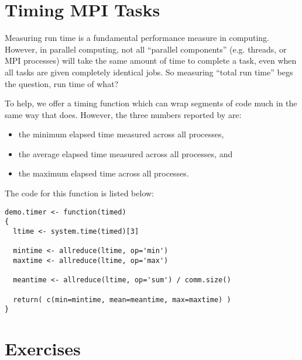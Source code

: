 \section{Timing MPI Tasks}

Measuring run time is a fundamental performance measure in computing.
However, in parallel computing, not all ``parallel components'' (e.g.
threads, or MPI processes) will take the same amount of time to complete
a task, even when all tasks are given completely identical jobs.
So measuring ``total run time'' begs the question, run time of what?

To help, we offer a timing function  which can wrap
segments of code much in the same way that  does.
However, the three numbers reported by  are:
\begin{itemize}
\item the minimum elapsed time measured across all processes,
\item the average elapsed time measured across all processes, and
\item the maximum elapsed time across all processes.
\end{itemize}
The code for this function is listed below:

\begin{lstlisting}[language=rr,title=Timer Function]
demo.timer <- function(timed)
{
  ltime <- system.time(timed)[3]
  
  mintime <- allreduce(ltime, op='min')
  maxtime <- allreduce(ltime, op='max')
  
  meantime <- allreduce(ltime, op='sum') / comm.size()
  
  return( c(min=mintime, mean=meantime, max=maxtime) )
}
\end{lstlisting}



\section{Exercises}
\label{sec:mpi_for_the_r_user_exercise}


